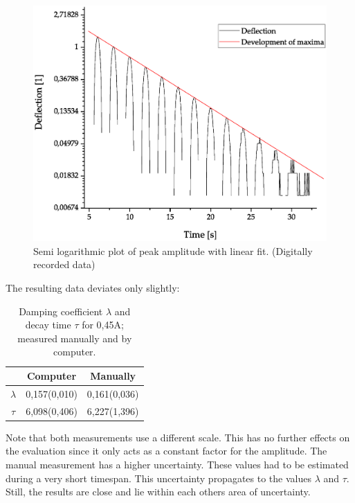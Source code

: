 \documentclass{article}
\begin{document}
\begin{figure}[H]
\centering
\includegraphics[width=350pt]{CD1-L-E.eps}
\caption{Semi logarithmic plot of peak amplitude with linear fit. (Digitally recorded data)}
\label{fig:length_eight_mouse}
\end{figure}
The resulting data deviates only slightly:\\
\begin{table}[H]
\caption{Damping coefficient $\lambda$ and decay time $\tau$ for 0,45A; measured manually and by computer.}
\centering
\begin{tabular}{|c|c|c|}
\hline 
  & Computer & Manually \\ 
\hline 
$\lambda$ & 0,157(0,010) & 0,161(0,036) \\ 
\hline 
$\tau$ & 6,098(0,406) & 6,227(1,396) \\ 
\hline 
\end{tabular}
\end{table}
\noindent
Note that both measurements use a different scale. This has no further effects on the evaluation since it only acts as a constant factor for the amplitude.
The manual measurement has a higher uncertainty. These values had to be estimated during a very short timespan. This uncertainty propagates to the values $\lambda$ and $\tau$. Still, the results are close and lie within each others area of uncertainty.
\end{document}
